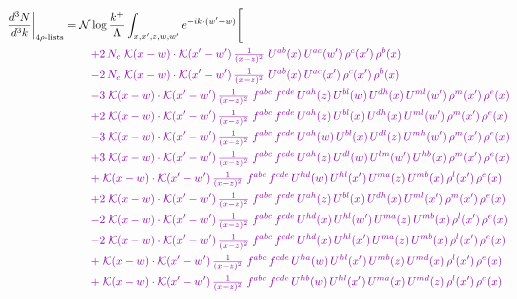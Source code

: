 \documentclass[10pt]{article}
\numberwithin{equation}{section}
\newcommand{\NN}{\mathcal N\log\frac{k^+}{\Lambda}}
\begin{document}
\begin{align}
\frac{d^3N}{d^3k}\bigg|_{4\rho\text{-lists}}={}&\NN\int_{x,x',z,w,w'}e^{-ik\cdot(w'-w)}\Bigg[\notag\\
&\quad{\color{CC}+2\,N_c\;\mathcal{K}(x-w)\cdot\mathcal{K}(x'-w')\,\tfrac{1}{(x-z)^{2}}\;U^{ab}(x)\,U^{ac}(w')\,\rho^{c}(x')\,\rho^{b}(x)}\notag\\
&\quad{\color{CC}-2\,N_c\;\mathcal{K}(x-w)\cdot\mathcal{K}(x'-w')\,\tfrac{1}{(x-z)^{2}}\;U^{ab}(x)\,U^{ac}(x')\,\rho^{c}(x')\,\rho^{b}(x)}\notag\\
&\quad{\color{CC}-3\;\mathcal{K}(x-w)\cdot\mathcal{K}(x'-w')\,\tfrac{1}{(x-z)^{2}}\;f^{abc}\,f^{cde}\,U^{ah}(z)\,U^{bl}(w)\,U^{dh}(x)\,U^{ml}(w')\,\rho^{m}(x')\,\rho^{e}(x)}\notag\\
&\quad{\color{CC}+2\;\mathcal{K}(x-w)\cdot\mathcal{K}(x'-w')\,\tfrac{1}{(x-z)^{2}}\;f^{abc}\,f^{cde}\,U^{ah}(z)\,U^{bl}(x)\,U^{dh}(x)\,U^{ml}(w')\,\rho^{m}(x')\,\rho^{e}(x)}\notag\\
&\quad{\color{CC}-3\;\mathcal{K}(x-w)\cdot\mathcal{K}(x'-w')\,\tfrac{1}{(x-z)^{2}}\;f^{abc}\,f^{cde}\,U^{ah}(w)\,U^{bl}(x)\,U^{dl}(z)\,U^{mh}(w')\,\rho^{m}(x')\,\rho^{e}(x)}\notag\\
&\quad{\color{CC}+3\;\mathcal{K}(x-w)\cdot\mathcal{K}(x'-w')\,\tfrac{1}{(x-z)^{2}}\;f^{abc}\,f^{cde}\,U^{ah}(z)\,U^{dl}(w)\,U^{lm}(w')\,U^{hb}(x)\,\rho^{m}(x')\,\rho^{e}(x)}\notag\\
&\quad{\color{CC}+\;\mathcal{K}(x-w)\cdot\mathcal{K}(x'-w')\,\tfrac{1}{(x-z)^{2}}\;f^{abc}\,f^{cde}\,U^{hd}(w)\,U^{hl}(x')\,U^{ma}(z)\,U^{mb}(x)\,\rho^{l}(x')\,\rho^{e}(x)}\notag\\
&\quad{\color{CC}+2\;\mathcal{K}(x-w)\cdot\mathcal{K}(x'-w')\,\tfrac{1}{(x-z)^{2}}\;f^{abc}\,f^{cde}\,U^{ah}(z)\,U^{bl}(x)\,U^{dh}(x)\,U^{ml}(x')\,\rho^{m}(x')\,\rho^{e}(x)}\notag\\
&\quad{\color{CC}-2\;\mathcal{K}(x-w)\cdot\mathcal{K}(x'-w')\,\tfrac{1}{(x-z)^{2}}\;f^{abc}\,f^{cde}\,U^{hd}(x)\,U^{hl}(w')\,U^{ma}(z)\,U^{mb}(x)\,\rho^{l}(x')\,\rho^{e}(x)}\notag\\
&\quad{\color{CC}-2\;\mathcal{K}(x-w)\cdot\mathcal{K}(x'-w')\,\tfrac{1}{(x-z)^{2}}\;f^{abc}\,f^{cde}\,U^{hd}(x)\,U^{hl}(x')\,U^{ma}(z)\,U^{mb}(x)\,\rho^{l}(x')\,\rho^{e}(x)}\notag\\
&\quad{\color{CC}+\;\mathcal{K}(x-w)\cdot\mathcal{K}(x'-w')\,\tfrac{1}{(x-z)^{2}}\;f^{abc}\,f^{cde}\,U^{ha}(w)\,U^{hl}(x')\,U^{mb}(z)\,U^{md}(x)\,\rho^{l}(x')\,\rho^{e}(x)}\notag\\
&\quad{\color{CC}+\;\mathcal{K}(x-w)\cdot\mathcal{K}(x'-w')\,\tfrac{1}{(x-z)^{2}}\;f^{abc}\,f^{cde}\,U^{hb}(w)\,U^{hl}(x')\,U^{ma}(x)\,U^{md}(z)\,\rho^{l}(x')\,\rho^{e}(x)}\notag\\

\end{align}
\end{document}
